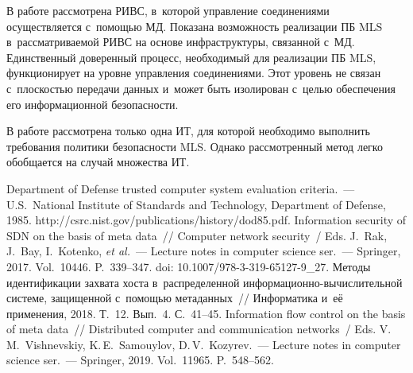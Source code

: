 \begin{multicols}{2}
  В работе рассмотрена РИВС, в~которой управ\-ле\-ние соединениями 
осуществляется с~помощью МД. Показана возможность реализации 
ПБ MLS в~рассматриваемой РИВС на основе 
инфраструктуры, связанной с~МД. Единственный доверенный процесс, 
необходимый для реализации ПБ MLS, функционирует на 
уровне управ\-ле\-ния соединениями. Этот уровень не связан с~плос\-костью передачи 
данных и~может быть изолирован с~\mbox{целью} обеспечения его информационной 
безопас\-ности. 
  
  В работе рассмотрена только одна ИТ, для которой необходимо выполнить 
требования политики безопасности MLS. Однако рассмотренный метод легко 
обобщается на случай множества ИТ.
  

{\small\frenchspacing
 {%
 \begin{thebibliography}{99}
Department of Defense trusted computer system evaluation criteria.~--- U.S.\ National Institute of 
Standards and Technology, Department of Defense, 1985. {\sf 
http://csrc.nist.gov/publications/history/dod85.\linebreak pdf}. 
 Information security of SDN 
on the basis of meta data~// Computer 
network security~/ Eds. J.~Rak, J.~Bay, I.~Kotenko, \textit{et al.}~---
Lecture notes in computer science ser.~--- Springer, 2017. 
Vol.~10446.  P.~339--347. doi: 10.1007/978-3-319-65127-9\_27.
 Методы идентификации 
захвата хоста в~распределенной ин\-фор\-ма\-ци\-он\-но-вы\-чис\-ли\-тель\-ной системе, 
защищенной с~по\-мощью метаданных~// Информатика и~её применения, 2018. Т.~12. Вып.~4. 
С.~41--45.
Information flow control on the basis of meta 
data~// Distributed computer and communication networks~/ 
Eds. V.\,M.~Vishnevskiy, K.\,E.~Samouylov, D.\,V.~Kozyrev.~--- 
Lecture notes
in computer science ser.~--- Springer,
 2019. Vol.~11965. P.~548--562.


\end{thebibliography}}}
\end{multicols}
